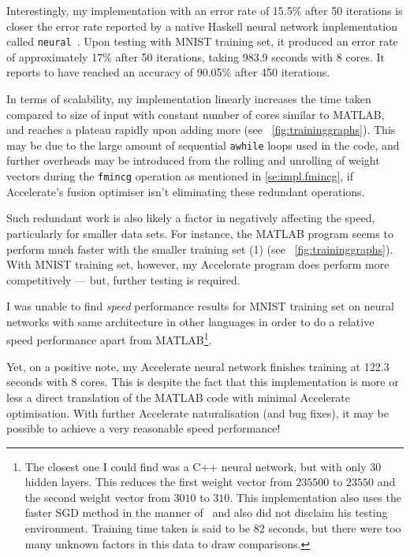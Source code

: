 Interestingly, my implementation with an error rate of 15.5\% after 50 iterations is closer the error rate reported by a native Haskell neural network implementation called \texttt{neural}~\cite{Bru16}. Upon testing with MNIST training set, it produced an error rate of approximately 17\% after 50 iterations, taking 983.9 seconds with 8 cores. It reports to have reached an accuracy of 90.05\% after 450 iterations. 


In terms of scalability, my implementation linearly increases the time taken compared to size of input with constant number of cores similar to MATLAB, and reaches a plateau rapidly upon adding more (see ~\ref{fig:traininggraphs}). This may be due to the large amount of sequential \texttt{awhile} loops used in the code, and further overheads may be introduced from the rolling and unrolling of weight vectors during the \texttt{fmincg} operation as mentioned in \ref{se:impl.fmincg}, if Accelerate's fusion optimiser isn't eliminating these redundant operations.

Such redundant work is also likely a factor in negatively affecting the speed, particularly for smaller data sets. For instance, the MATLAB program seems to perform much faster with the smaller training set (1) (see ~\ref{fig:traininggraphs}). With MNIST training set, however, my Accelerate program does perform more competitively --- but, further testing is required. 

I was unable to find \textit{speed} performance results for MNIST training set on neural networks with same architecture in other languages in order to do a relative speed performance apart from MATLAB\footnote{The closest one I could find was a C++ neural network\cite{Wol17}, but with only 30 hidden layers. This reduces the first weight vector from $235500$ to $23550$ and the second weight vector from $3010$ to $310$. This implementation also uses the faster SGD method in the manner of~\cite{LeC98} and also did not disclaim his testing environment. Training time taken is said to be 82 seconds, but there were too many unknown factors in this data to draw comparisons.}.

Yet, on a positive note, my Accelerate neural network finishes training at 122.3 seconds with 8 cores. This is despite the fact that this implementation is more or less a direct translation of the MATLAB code with minimal Accelerate optimisation. With further Accelerate naturalisation (and bug fixes), it may be possible to achieve a very reasonable speed performance!

